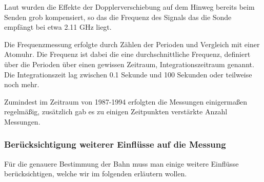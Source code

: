 Laut \cite{Markwardt2002} wurden die Effekte der Dopplerverschiebung auf dem Hinweg bereits beim Senden grob kompensiert, so das die Frequenz des Signals das die Sonde empfängt bei etwa 2.11 GHz liegt.

Die Frequenzmessung erfolgte durch Zählen der Perioden und Vergleich mit einer Atomuhr.\cite{Nieto2007} %
Die Frequenz ist dabei die eine durchschnittliche Frequenz, definiert über die Perioden über einen gewissen Zeitraum, Integrationszeitraum genannt. Die Integrationszeit lag zwischen 0.1 Sekunde und 100 Sekunden oder teilweise noch mehr.\cite{Markwardt2002}

Zumindest im Zeitraum von 1987-1994 erfolgten die Messungen einigermaßen regelmäßig, zusätzlich gab es zu einigen Zeitpunkten verstärkte Anzahl Messungen.\cite{Markwardt2002} %


\subsubsection{Berücksichtigung weiterer Einflüsse auf die Messung}
Für die genauere Bestimmung der Bahn muss man einige weitere Einflüsse berücksichtigen, welche wir im folgenden erläutern wollen.

